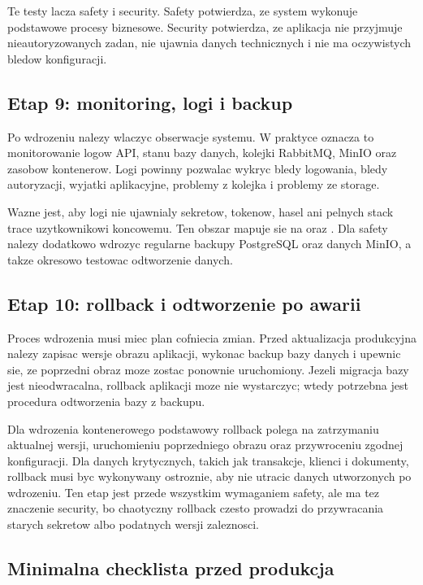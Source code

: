 \documentclass[12pt,a4paper]{article}
\begin{document}
Te testy lacza safety i security. Safety potwierdza, ze system wykonuje podstawowe procesy biznesowe. Security potwierdza, ze aplikacja nie przyjmuje nieautoryzowanych zadan, nie ujawnia danych technicznych i nie ma oczywistych bledow konfiguracji.

\subsection{Etap 9: monitoring, logi i backup}

Po wdrozeniu nalezy wlaczyc obserwacje systemu. W praktyce oznacza to monitorowanie logow API, stanu bazy danych, kolejki RabbitMQ, MinIO oraz zasobow kontenerow. Logi powinny pozwalac wykryc bledy logowania, bledy autoryzacji, wyjatki aplikacyjne, problemy z kolejka i problemy ze storage.

Wazne jest, aby logi nie ujawnialy sekretow, tokenow, hasel ani pelnych stack trace uzytkownikowi koncowemu. Ten obszar mapuje sie na  oraz . Dla safety nalezy dodatkowo wdrozyc regularne backupy PostgreSQL oraz danych MinIO, a takze okresowo testowac odtworzenie danych.

\subsection{Etap 10: rollback i odtworzenie po awarii}

Proces wdrozenia musi miec plan cofniecia zmian. Przed aktualizacja produkcyjna nalezy zapisac wersje obrazu aplikacji, wykonac backup bazy danych i upewnic sie, ze poprzedni obraz moze zostac ponownie uruchomiony. Jezeli migracja bazy jest nieodwracalna, rollback aplikacji moze nie wystarczyc; wtedy potrzebna jest procedura odtworzenia bazy z backupu.

Dla wdrozenia kontenerowego podstawowy rollback polega na zatrzymaniu aktualnej wersji, uruchomieniu poprzedniego obrazu oraz przywroceniu zgodnej konfiguracji. Dla danych krytycznych, takich jak transakcje, klienci i dokumenty, rollback musi byc wykonywany ostroznie, aby nie utracic danych utworzonych po wdrozeniu. Ten etap jest przede wszystkim wymaganiem safety, ale ma tez znaczenie security, bo chaotyczny rollback czesto prowadzi do przywracania starych sekretow albo podatnych wersji zaleznosci.

\subsection{Minimalna checklista przed produkcja}
\end{document}
